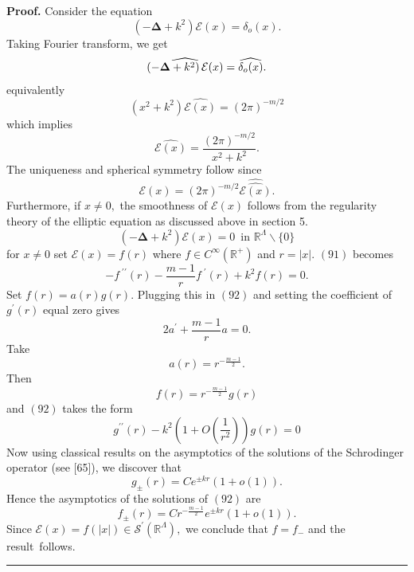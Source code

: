 \documentclass{article}
\newenvironment{proof}[1][Proof]{\noindent\textbf{#1.} }{\ \rule{0.5em}{0.5em}}
\begin{document}
\begin{proof}
Consider the equation 
\begin{equation}
\left( -\mathbf{\Delta }+k^{2}\right) \mathcal{E}(x)=\delta _{o}(x).
\end{equation}%
Taking Fourier transform, we get 
\begin{equation}
\widehat{\left( -\mathbf{\Delta }+k^{2}\right) \mathcal{E}(x)}=\widehat{%
\delta _{o}(x)}.
\end{equation}%
equivalently%
\begin{equation}
\left( x^{2}+k^{2}\right) \widehat{\mathcal{E}(x)}=\left( 2\pi \right)
^{-m/2}
\end{equation}%
which implies 
\begin{equation}
\widehat{\mathcal{E}(x)}=\frac{\left( 2\pi \right) ^{-m/2}}{x^{2}+k^{2}}.
\end{equation}%
The uniqueness and spherical symmetry follow since$\ $%
\begin{equation}
\mathcal{E}(x)=\left( 2\pi \right) ^{-m/2}\widehat{\widehat{\mathcal{E}(x)}}.
\end{equation}%
Furthermore, if $x\neq 0,$ the smoothness of $\mathcal{E}(x)$ follows from
the regularity theory of the elliptic equation as discussed above in section
5.%
\begin{equation}
\left( -\mathbf{\Delta }+k^{2}\right) \mathcal{E}(x)=0\;\ \text{in\ \ }%
\mathbb{R}^{\Lambda }\backslash \{0\}
\end{equation}%
for $x\neq 0$ set $\mathcal{E}(x)=f(r)$ where $f\in C^{\infty }(\mathbb{R}%
^{+})$ and $r=\left| x\right| .$ $(91)$ becomes 
\begin{equation}
-f^{\;\prime \prime }(r)-\frac{m-1}{r}f^{\;\prime }(r)+k^{2}f(r)=0.
\end{equation}%
Set $f(r)=a(r)g(r).$ Plugging this in $(92)$ and setting the coefficient of $%
g^{\prime }(r)$ equal zero gives 
\begin{equation}
2a^{\prime }+\frac{m-1}{r}a=0.
\end{equation}%
Take%
\begin{equation*}
a(r)=r^{-\tfrac{m-1}{2}}.
\end{equation*}%
Then%
\begin{equation*}
f(r)=r^{-\tfrac{m-1}{2}}g(r)
\end{equation*}%
and $(92)$ takes the form%
\begin{equation}
g^{\prime \prime }(r)-k^{2}(1+O(\frac{1}{r^{2}}))g(r)=0
\end{equation}%
Now using classical results on the asymptotics of the solutions of the
Schrodinger operator (see [65]), we discover that 
\begin{equation}
g_{\pm }(r)=Ce^{\pm kr}(1+o(1)).
\end{equation}%
Hence the asymptotics of the solutions of $(92)$ are%
\begin{equation}
f_{\pm }(r)=Cr^{-\tfrac{m-1}{2}}e^{\pm kr}(1+o(1)).
\end{equation}%
Since $\mathcal{E}(x)=f(\left| x\right| )\in \mathcal{S}^{\prime }(\mathbb{R}%
^{\Lambda }),$ we conclude that $f=f_{-}$ and the result\ follows.
\end{proof}
\end{document}
